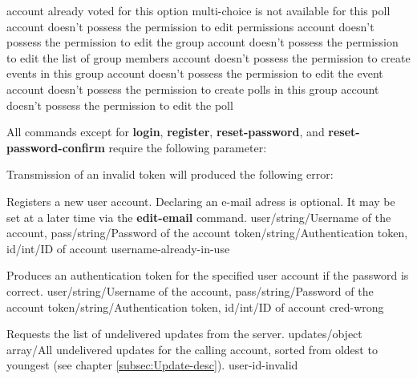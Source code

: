 \documentclass[parskip=full,11pt]{scrartcl}
\begin{document}
{account already voted for this option}
{multi-choice is not available for this poll}
{account doesn't possess the permission to edit permissions}
{account doesn't possess the permission to edit the group}
{account doesn't possess the permission to edit the list of group members}
{account doesn't possess the permission to create events in this group}
{account doesn't possess the permission to edit the event}
{account doesn't possess the permission to create polls in this group}
{account doesn't possess the permission to edit the poll}

All commands except for \textbf{login}, \textbf{register},
\textbf{reset-password}, and \textbf{reset-password-confirm} require the
following parameter:\\
\par Transmission of an invalid token will produced the following error:\\

{Registers a new user account.
Declaring an e-mail adress is optional.
It may be set at a later time via the \textbf{edit-email} command.}
{user/string/Username of the account,
pass/string/Password of the account}
{token/string/Authentication token,
id/int/ID of account}
{username-already-in-use}
{}

{Produces an authentication token for the specified user account if the
password is correct.}
{user/string/Username of the account,
pass/string/Password of the account}
{token/string/Authentication token,
id/int/ID of account}
{cred-wrong}
{}

{Requests the list of undelivered updates from the server.}
{}
{updates/object array/All undelivered updates for the calling account{,} sorted
from oldest to youngest (see chapter \ref{subsec:Update-desc}).}
{user-id-invalid}
{}
\end{document}
